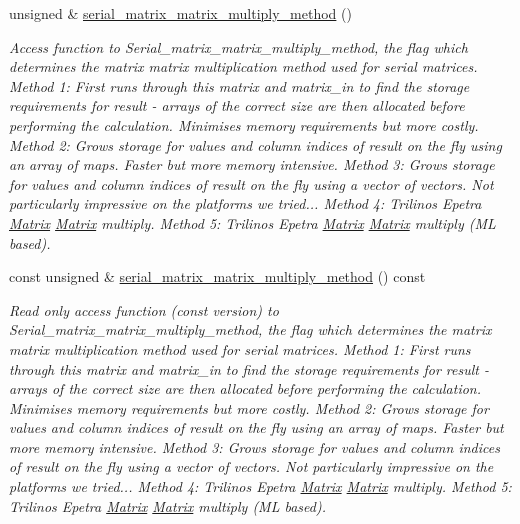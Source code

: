 \begin{DoxyCompactItemize}
unsigned \& \hyperlink{classoomph_1_1CRDoubleMatrix_aa09d92094d0ccf281dded547edfc981e}{serial\+\_\+matrix\+\_\+matrix\+\_\+multiply\+\_\+method} ()
\begin{DoxyCompactList}\small\item\em Access function to Serial\+\_\+matrix\+\_\+matrix\+\_\+multiply\+\_\+method, the flag which determines the matrix matrix multiplication method used for serial matrices. Method 1\+: First runs through this matrix and matrix\+\_\+in to find the storage requirements for result -\/ arrays of the correct size are then allocated before performing the calculation. Minimises memory requirements but more costly. Method 2\+: Grows storage for values and column indices of result \textquotesingle{}on the fly\textquotesingle{} using an array of maps. Faster but more memory intensive. Method 3\+: Grows storage for values and column indices of result \textquotesingle{}on the fly\textquotesingle{} using a vector of vectors. Not particularly impressive on the platforms we tried... Method 4\+: Trilinos Epetra \hyperlink{classoomph_1_1Matrix}{Matrix} \hyperlink{classoomph_1_1Matrix}{Matrix} multiply. Method 5\+: Trilinos Epetra \hyperlink{classoomph_1_1Matrix}{Matrix} \hyperlink{classoomph_1_1Matrix}{Matrix} multiply (ML based). \end{DoxyCompactList}\item 
const unsigned \& \hyperlink{classoomph_1_1CRDoubleMatrix_ae8eff79ad9ac6e399ef4b677b6e0e1e5}{serial\+\_\+matrix\+\_\+matrix\+\_\+multiply\+\_\+method} () const
\begin{DoxyCompactList}\small\item\em Read only access function (const version) to Serial\+\_\+matrix\+\_\+matrix\+\_\+multiply\+\_\+method, the flag which determines the matrix matrix multiplication method used for serial matrices. Method 1\+: First runs through this matrix and matrix\+\_\+in to find the storage requirements for result -\/ arrays of the correct size are then allocated before performing the calculation. Minimises memory requirements but more costly. Method 2\+: Grows storage for values and column indices of result \textquotesingle{}on the fly\textquotesingle{} using an array of maps. Faster but more memory intensive. Method 3\+: Grows storage for values and column indices of result \textquotesingle{}on the fly\textquotesingle{} using a vector of vectors. Not particularly impressive on the platforms we tried... Method 4\+: Trilinos Epetra \hyperlink{classoomph_1_1Matrix}{Matrix} \hyperlink{classoomph_1_1Matrix}{Matrix} multiply. Method 5\+: Trilinos Epetra \hyperlink{classoomph_1_1Matrix}{Matrix} \hyperlink{classoomph_1_1Matrix}{Matrix} multiply (ML based). \end{DoxyCompactList}\item 

\end{DoxyCompactItemize}

